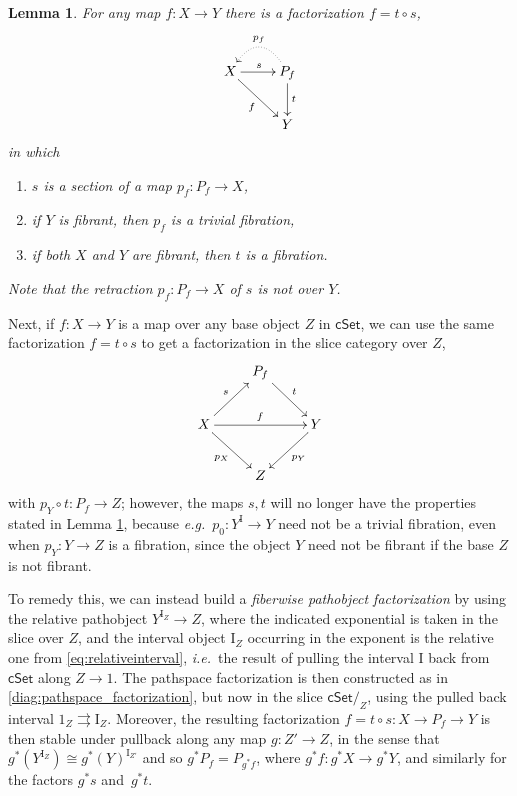 \documentclass[11pt,reqno]{amsart}
\newcommand{\ie}{\emph{i.e.}}
\newcommand{\eg}{\emph{e.g.}}
\newcommand{\cSet}{\ensuremath{\mathsf{cSet}}}
\newcommand{\cSetZ}{\ensuremath{\mathsf{cSet}/_{\!Z}}}
\newcommand{\ra}{\ensuremath{\rightarrow}}
\renewcommand{\to}{\ensuremath{\rightarrow}}
\newcommand{\I}{\ensuremath{\mathrm{I}}}
\newtheorem{lemma}[theorem]{Lemma}
\theoremstyle{remark}
\theoremstyle{definition}
\begin{document}
\begin{lemma}\label{lemma:pathspace_factorization} 
For any map $f : X\ra Y$ 
there is a factorization $f = t\circ s$,
\begin{equation}\label{diag:pathspace_factorization3}
\xymatrix{
X \ar[r]^s \ar[rd]_f & \ar@{.>}@/_1.5pc/[l]_{p_f} P_f \ar[d]^t \\
& Y
}
\end{equation} 
in which
\begin{enumerate}
\item $s$ is a section of a map $p_f : P_f \to X$,
\item  if $Y$ is fibrant, then $p_f$ is a trivial fibration,
\item if both $X$ and $Y$ are fibrant, then $t$ is a fibration.
\end{enumerate}
Note that the retraction $p_f : P_f \ra X$ of $s$ is not over $Y$.
\end{lemma}

Next, if $f:X\ra Y$ is a map over any base object $Z$ in $\cSet$, we can use the same factorization $f = t\circ s$ to get a factorization in the slice category over $Z$,
%  
\begin{equation}\label{diag:pathobjectoverabase}
\xymatrix{
&  P_f  \ar[rd]^t & \\
X \ar[rr]^f \ar[rd]_{p_X} \ar[ru]^{s} && Y \ar[ld]^{p_Y} \\
& Z
}
\end{equation}
%
with $p_Y \circ t : P_f \to Z$; however, the maps $s, t$ will no longer have the properties stated in Lemma \ref{lemma:pathspace_factorization}, because \eg\ $p_0: Y^\I \to Y$ need not be a trivial fibration, even when $p_Y : Y\to Z$ is a fibration, since the object $Y$ need not be fibrant if the base $Z$ is not fibrant.

To remedy this, we can instead build a \emph{fiberwise pathobject factorization} by using the relative pathobject $Y^{\I_Z} \to Z$, where the indicated exponential is taken in the slice over $Z$, and the interval object $\I_Z$ occurring in the exponent is the relative one from \eqref{eq:relativeinterval}, \ie\ the result of pulling the interval $\I$ back from $\cSet$ along $Z\to 1$.  The pathspace factorization is then constructed as in \eqref{diag:pathspace_factorization}, but now in the slice $\cSetZ$, using the pulled back interval $1_Z\rightrightarrows \I_Z$. Moreover, the resulting factorization $f=t\circ s:X\ra P_f \ra Y$ is then stable under pullback along any map $g : Z' \ra Z$, in the sense that $g^*(Y^{\I_Z}) \cong g^*(Y)^{\I_{Z'}}$ and so $g^*P_f = P_{g^*f}$, where $g^*f : g^*X \ra g^* Y$, and similarly for the factors $g^*s$ and~$g^*t$.  
\end{document}
